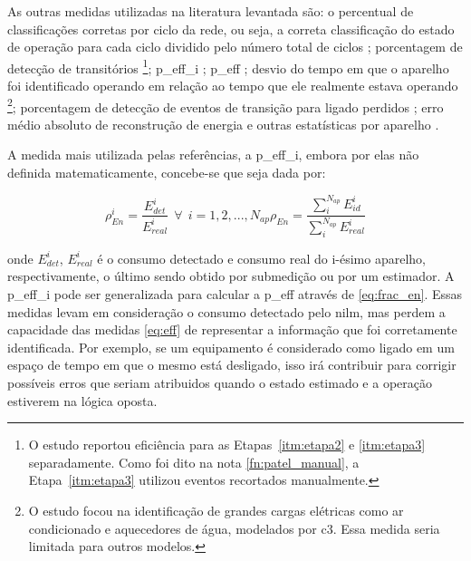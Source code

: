 As outras medidas utilizadas na literatura levantada são: o
percentual de classificações corretas por ciclo da rede, ou seja, a
correta classificação do estado de operação para cada ciclo dividido
pelo número total de ciclos
\cite{nilm_srinivasan_nn_2006_27,nilm_suzuki_2011_35}; porcentagem de
detecção de transitórios \cite{nilm_patel_2007_29}\footnote{O estudo
reportou eficiência para as Etapas~\ref{itm:etapa2} e \ref{itm:etapa3}
separadamente. Como foi dito na nota \ref{fn:patel_manual}, a
Etapa~\ref{itm:etapa3} utilizou eventos recortados manualmente.};
\gls{p_eff_i}
\cite{nilm_hart_1992_8,nilm_cole_data_extraction_1998_14,
nilm_cole_extra_info_surge_1998_15,nilm_farinaccio_16ssamp_1999_17,
nilm_marceau_16ssamp_improved_1999_18}; \gls{p_eff} 
\cite{2010_nilm_melhorando_pph_usa_37}; desvio
do tempo em que o aparelho foi identificado operando em relação ao
tempo que ele realmente estava operando
\cite{nilm_farinaccio_16ssamp_1999_17}\footnote{O estudo focou na
identificação de grandes cargas elétricas como ar condicionado e
aquecedores de água, modelados por \gls{c3}\label{fn:valc3}. Essa
medida seria limitada para outros modelos.}; porcentagem de detecção
de eventos de transição para ligado perdidos
\cite{nilm_farinaccio_16ssamp_1999_17}; erro médio
absoluto de reconstrução de energia e outras estatísticas por aparelho
\cite{nilm_powers_15minsamp_1991_16}.

A medida mais utilizada pelas referências, a \gls{p_eff_i}, embora
por elas não definida matematicamente, concebe-se que seja dada por:

\begin{subequations}
\begin{equation}\label{eq:frac_en_app}
\rho_{En}^i = \frac{E_{det}^i}{E_{real}^i} ~~ \forall ~~ 
i = 1,2,...,N_{ap}
\end{equation}
\begin{equation}\label{eq:frac_en}
\rho_{En} = \frac{\sum_{i}^{N_{ap}}E_{id}^i}{\sum_{i}^{N_{ap}}E_{real}^i} 
\end{equation}
\end{subequations}

\noindent onde $E_{det}^i$, $E_{real}^i$ é o consumo detectado e
consumo real do i-ésimo aparelho, respectivamente, o último sendo
obtido por submedição ou por um estimador. A \gls{p_eff_i}
pode ser generalizada para calcular a \gls{p_eff} através de
\ref{eq:frac_en}.  Essas medidas levam em consideração o consumo
detectado pelo \gls{nilm}, mas perdem a capacidade das medidas 
\ref{eq:eff} de representar a informação que foi corretamente
identificada. Por exemplo, se um equipamento é considerado como ligado
em um espaço de tempo em que o mesmo está desligado, isso irá
contribuir para corrigir possíveis erros que seriam atribuidos quando
o estado estimado e a operação estiverem na lógica oposta.

